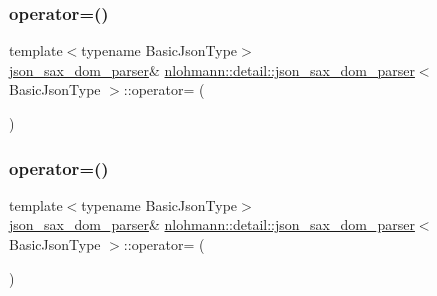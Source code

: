 \mbox{\label{classnlohmann_1_1detail_1_1json__sax__dom__parser_a98448bf2cbc15d15e2eddc5a09a40a42}} 
\subsubsection{\texorpdfstring{operator=()}{operator=()}\hspace{0.1cm}{\footnotesize\ttfamily [1/2]}}
{\footnotesize\ttfamily template$<$typename Basic\+Json\+Type$>$ \\
\mbox{\hyperlink{classnlohmann_1_1detail_1_1json__sax__dom__parser}{json\+\_\+sax\+\_\+dom\+\_\+parser}}\& \mbox{\hyperlink{classnlohmann_1_1detail_1_1json__sax__dom__parser}{nlohmann\+::detail\+::json\+\_\+sax\+\_\+dom\+\_\+parser}}$<$ Basic\+Json\+Type $>$\+::operator= (\begin{DoxyParamCaption}\item[{const \mbox{\hyperlink{classnlohmann_1_1detail_1_1json__sax__dom__parser}{json\+\_\+sax\+\_\+dom\+\_\+parser}}$<$ Basic\+Json\+Type $>$ \&}]{ }\end{DoxyParamCaption})\hspace{0.3cm}{\ttfamily [delete]}}

\mbox{\label{classnlohmann_1_1detail_1_1json__sax__dom__parser_aff928a07e40e4efb16b3ff9384f4401c}} 
\subsubsection{\texorpdfstring{operator=()}{operator=()}\hspace{0.1cm}{\footnotesize\ttfamily [2/2]}}
{\footnotesize\ttfamily template$<$typename Basic\+Json\+Type$>$ \\
\mbox{\hyperlink{classnlohmann_1_1detail_1_1json__sax__dom__parser}{json\+\_\+sax\+\_\+dom\+\_\+parser}}\& \mbox{\hyperlink{classnlohmann_1_1detail_1_1json__sax__dom__parser}{nlohmann\+::detail\+::json\+\_\+sax\+\_\+dom\+\_\+parser}}$<$ Basic\+Json\+Type $>$\+::operator= (\begin{DoxyParamCaption}\item[{\mbox{\hyperlink{classnlohmann_1_1detail_1_1json__sax__dom__parser}{json\+\_\+sax\+\_\+dom\+\_\+parser}}$<$ Basic\+Json\+Type $>$ \&\&}]{ }\end{DoxyParamCaption})\hspace{0.3cm}{\ttfamily [default]}}

